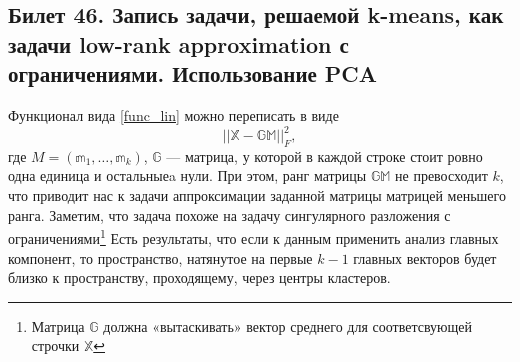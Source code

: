\subsection{Билет 46. Запись задачи, решаемой k-means, как задачи low-rank approximation с	ограничениями. Использование PCA}
Функционал вида \eqref{func_lin} можно переписать в виде
\begin{equation}
    ||\mathbb{X} - \mathbb{G}\mathbb{M}||^2_F,
\end{equation}
где $M = (\mathbb{m}_1, \ldots, \mathbb{m}_k)$, $\mathbb{G}$ --- матрица, у которой в каждой строке
стоит ровно одна единица и остальныеa нули.
При этом, ранг матрицы $\mathbb{G}\mathbb{M}$ не превосходит $k$, что приводит нас к задачи
аппроксимации заданной матрицы матрицей меньшего ранга.  Заметим, что задача похоже на задачу
сингулярного разложения с ограничениями\footnote{Матрица $\mathbb{G}$ должна «вытаскивать» вектор среднего для соответсвующей строчки $\mathbb{X}$}
Есть результаты, что если к данным применить анализ главных компонент, то пространство, натянутое на первые $k-1$ главных векторов будет близко к пространству, проходящему, через центры кластеров.
